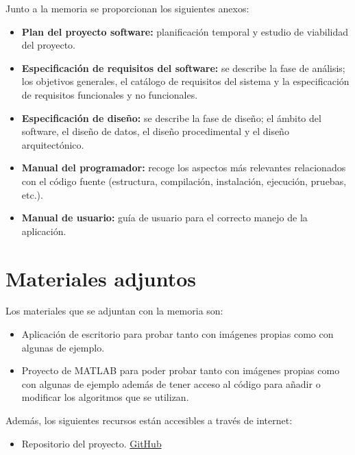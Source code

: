 Junto a la memoria se proporcionan los siguientes anexos:

\begin{itemize}
    \tightlist
        \item
            \textbf{Plan del proyecto software:} planificación temporal y estudio de viabilidad del proyecto.
        \item
            \textbf{Especificación de requisitos del software:} se describe la fase de análisis; los objetivos generales, el catálogo de requisitos del sistema y la especificación de requisitos funcionales y no funcionales.
        \item
            \textbf{Especificación de diseño:} se describe la fase de diseño; el ámbito del software, el diseño de datos, el diseño procedimental y el diseño arquitectónico.
        \item
            \textbf{Manual del programador:} recoge los aspectos más relevantes relacionados con el código fuente (estructura, compilación, instalación, ejecución, pruebas, etc.).
        \item
            \textbf{Manual de usuario:} guía de usuario para el correcto manejo de la aplicación.
\end{itemize}

\section{Materiales adjuntos}\label{materiales-adjuntos}

Los materiales que se adjuntan con la memoria son: 

\begin{itemize}
    \tightlist
        \item
            Aplicación de escritorio para probar tanto con imágenes propias como con algunas de ejemplo.
        \item
            Proyecto de MATLAB para poder probar tanto con imágenes propias como con algunas de ejemplo además de tener acceso al código para añadir o modificar los algoritmos que se utilizan.
\end{itemize}

Además, los siguientes recursos están accesibles a través de internet:

\begin{itemize}
    \tightlist
        \item
            Repositorio del proyecto. \href{https://github.com/jms1008/TFG-Invariantes-de-iluminacion-en-piezas-metalicas}{GitHub}
\end{itemize}
